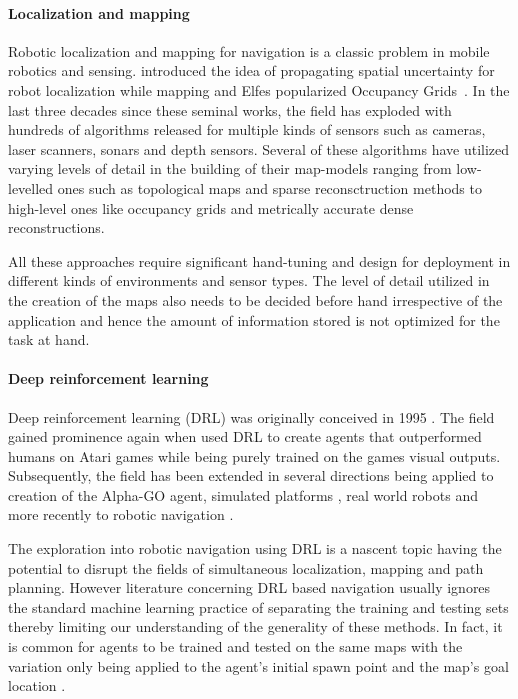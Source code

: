 \paragraph{Localization and mapping}
Robotic localization and mapping for navigation is a classic problem in  mobile robotics and sensing.
\cite{SmChIJRR1986} introduced the idea of propagating spatial uncertainty for robot localization while mapping and Elfes popularized Occupancy Grids~\cite{ElCOMPUTER1980}.
In the last three decades since these seminal works, the field has exploded with hundreds of algorithms released for multiple kinds of sensors such as cameras, laser scanners, sonars and depth sensors.
Several of these algorithms have utilized varying levels of detail in the building of their map-models ranging from low-levelled ones such as topological maps \cite{KuCOGSCI1978} and sparse reconsctruction methods to high-level ones like occupancy grids and metrically accurate dense reconstructions. 

All these approaches require significant hand-tuning and design for deployment in different kinds of environments and sensor types. The level of detail utilized in the creation of the  maps also needs to be decided before hand irrespective of the application and hence the amount of information stored is not optimized for the task at hand.

\paragraph{Deep reinforcement learning}
Deep reinforcement learning (DRL) was originally conceived in 1995 \cite{TeACM1995}. 
The field gained prominence again when \cite{MnKaSiNIPSDLW2013,MnKaSiNATURE2015} used DRL to create agents that outperformed humans on Atari games while being purely trained on the games visual outputs.
Subsequently, the field has been extended in several directions \cite{MnBaMiICML2016} being applied to creation of the Alpha-GO agent\cite{SiHuMaNATURE2016}, simulated platforms \cite{KaStJoNIPS2017}, real world robots \cite{LePaKrISER2017} and more recently to robotic navigation \cite{MiPaViICLR2017,OhChSiICML2016}.

The exploration into robotic navigation using DRL is a nascent topic having the potential to disrupt the fields of simultaneous localization, mapping and path planning. However literature concerning DRL based navigation usually ignores the standard machine learning practice of separating the training and testing sets thereby limiting our understanding of the generality of these methods. In fact, it is common for agents to be trained and tested on the same maps with the variation only being applied to the agent's initial spawn point and the map's goal location \cite{MiPaViICLR2017,ZhMoKoICRA2017,KuSaGaAPA2016}. 

